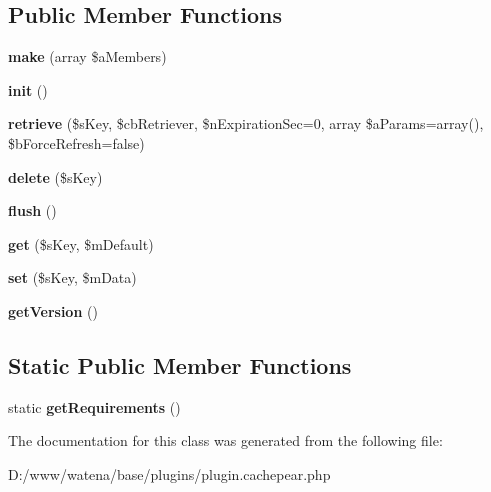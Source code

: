 \subsection*{Public Member Functions}
\begin{DoxyCompactItemize}
\item 
\hypertarget{class_cache_p_e_a_r_af6d331e2adeb384a525aea2a526a8d44}{{\bfseries make} (array \$a\-Members)}\label{class_cache_p_e_a_r_af6d331e2adeb384a525aea2a526a8d44}

\item 
\hypertarget{class_cache_p_e_a_r_ad574412e310e8a58909a5de29f10ae52}{{\bfseries init} ()}\label{class_cache_p_e_a_r_ad574412e310e8a58909a5de29f10ae52}

\item 
\hypertarget{class_cache_p_e_a_r_aa1902d6c8de71b721682edeebffb806f}{{\bfseries retrieve} (\$s\-Key, \$cb\-Retriever, \$n\-Expiration\-Sec=0, array \$a\-Params=array(), \$b\-Force\-Refresh=false)}\label{class_cache_p_e_a_r_aa1902d6c8de71b721682edeebffb806f}

\item 
\hypertarget{class_cache_p_e_a_r_a4449a766e984a10019648ffcd25f374d}{{\bfseries delete} (\$s\-Key)}\label{class_cache_p_e_a_r_a4449a766e984a10019648ffcd25f374d}

\item 
\hypertarget{class_cache_p_e_a_r_ac442c816d87798d1115d150fe806efac}{{\bfseries flush} ()}\label{class_cache_p_e_a_r_ac442c816d87798d1115d150fe806efac}

\item 
\hypertarget{class_cache_p_e_a_r_aea0069dc5d68a3b0bf339654e43b4b96}{{\bfseries get} (\$s\-Key, \$m\-Default)}\label{class_cache_p_e_a_r_aea0069dc5d68a3b0bf339654e43b4b96}

\item 
\hypertarget{class_cache_p_e_a_r_a65879d93d19c7fb9c2614f8aad6f971c}{{\bfseries set} (\$s\-Key, \$m\-Data)}\label{class_cache_p_e_a_r_a65879d93d19c7fb9c2614f8aad6f971c}

\item 
\hypertarget{class_cache_p_e_a_r_ac5f8b00a927cedef07df41abc604f2e4}{{\bfseries get\-Version} ()}\label{class_cache_p_e_a_r_ac5f8b00a927cedef07df41abc604f2e4}

\end{DoxyCompactItemize}
\subsection*{Static Public Member Functions}
\begin{DoxyCompactItemize}
\item 
\hypertarget{class_cache_p_e_a_r_aa317d0ad0a22fd9717f014d5a630e388}{static {\bfseries get\-Requirements} ()}\label{class_cache_p_e_a_r_aa317d0ad0a22fd9717f014d5a630e388}

\end{DoxyCompactItemize}


The documentation for this class was generated from the following file\-:\begin{DoxyCompactItemize}
\item 
D\-:/www/watena/base/plugins/plugin.\-cachepear.\-php\end{DoxyCompactItemize}
